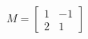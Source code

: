 \documentclass[preview]{standalone}
\begin{document}
\begin{align*}
M = \begin{bmatrix} 1 & -1 \\ 2 & 1 \end{bmatrix}
\end{align*}
\end{document}
